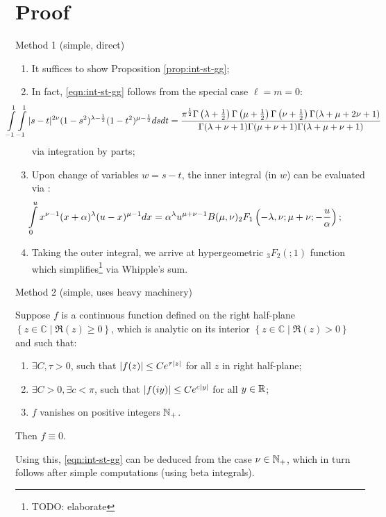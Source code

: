 \documentclass[pdf,notes]{beamer}
\begin{document}
\section{Proof}
\begin{frame}{Method 1 (simple, direct)}
	\begin{enumerate}
		\item It suffices to show Proposition \ref{prop:int-st-gg};
		\item In fact, \eqref{eqn:int-st-gg} follows from the special case $\ell=m=0$:
			{
				\footnotesize
			\begin{equation*}
				\kern-1cm\int_{- 1}^1 \int_{- 1}^1 | s - t |^{2 \nu} (1 - s^2)^{\lambda - \frac{1}{2}}
				(1 - t^2)^{\mu - \frac{1}{2}} d s d t = \frac{\pi^{\frac{1}{2}} \Gamma \left(
				\lambda + \frac{1}{2} \right) \Gamma \left( \mu + \frac{1}{2} \right) \Gamma
				\left( \nu + \frac{1}{2} \right) \Gamma (\lambda + \mu + 2 \nu + 1)}{\Gamma
				(\lambda + \nu + 1) \Gamma (\mu + \nu + 1) \Gamma (\lambda + \mu + \nu + 1)}
			\end{equation*}
		}
		via integration by parts;
		\item Upon change of variables $w=s-t$, the inner integral (in $w$) can be evaluated via \cite[ET II 186(9)]{gradshteinryzhik}:
		{
		\begin{equation*}
			\kern-1cm\int_0^u x^{\nu - 1} (x + \alpha)^{\lambda} (u - x)^{\mu - 1} d x =
			\alpha^{\lambda} u^{\mu + \nu - 1} B (\mu, \nu)_2 F_1 \left( - \lambda, \nu ;
			\mu + \nu ; - \frac{u}{\alpha} \right);
		\end{equation*}
	}
\item Taking the outer integral, we arrive at hypergeometric $_3F_2(;1)$ function which simplifies\footnote{TODO: elaborate} via Whipple's sum.
	\end{enumerate}
\end{frame}
\begin{frame}{Method 2 (simple, uses heavy machinery)}
	\begin{fact}
		Suppose $f$ is a continuous function defined on the right half-plane $\left\{ z\in\mathbb{C}\mid \Re(z)\ge0 \right\}$, which
		is analytic on its interior $\left\{ z\in\mathbb{C}\mid\Re(z)>0 \right\}$ and such that:\begin{enumerate}
			\item $\exists C,\tau>0$, such that $\left|f(z)\right|\le C e^{\tau\left|z\right|}$ for all $z$ in right half-plane;
			\item $\exists C>0,\exists c<\pi$, such that $\left|f(iy)\right|\le Ce^{c\left|y\right|}$ for all $y\in\mathbb{R}$;
			\item $f$ vanishes on positive integers $\mathbb{N}_+$.
		\end{enumerate}
		Then $f\equiv0$.
	\end{fact}
	Using this, \eqref{eqn:int-st-gg} can be deduced from the case $\nu\in\mathbb{N}_{+}$, which in turn follows after simple computations (using beta integrals).
\end{frame}
\end{document}
